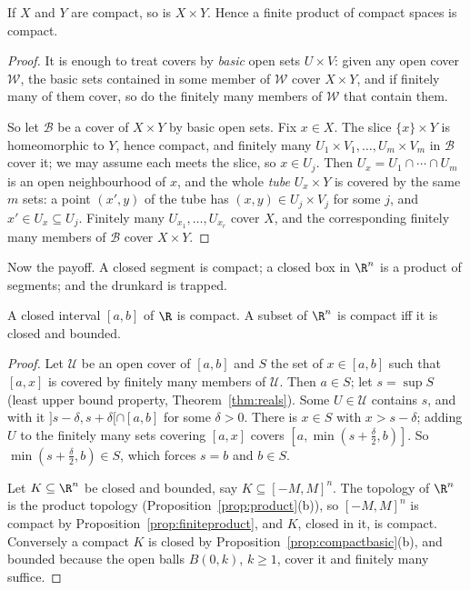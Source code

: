\begin{proposition}\label{prop:finiteproduct}
If $X$ and $Y$ are compact, so is $X\times Y$. Hence a finite product of compact spaces is compact.
\end{proposition}
\begin{proof}
It is enough to treat covers by \emph{basic} open sets $U\times V$: given any open cover $\mathcal W$, the basic sets contained in some member of $\mathcal W$
cover $X\times Y$, and if finitely many of them cover, so do the finitely many members of $\mathcal W$ that contain them.

So let $\mathcal B$ be a cover of $X\times Y$ by basic open sets. Fix $x\in X$. The slice $\{x\}\times Y$ is homeomorphic to $Y$, hence compact, and finitely many
$U_1\times V_1,\dots,U_m\times V_m$ in $\mathcal B$ cover it; we may assume each meets the slice, so $x\in U_j$. Then $U_x=U_1\cap\cdots\cap U_m$ is an open neighbourhood of
$x$, and the whole \emph{tube} $U_x\times Y$ is covered by the same $m$ sets: a point $(x',y)$ of the tube has $(x,y)\in U_j\times V_j$ for some $j$, and $x'\in U_x\subseteq U_j$.
Finitely many $U_{x_1},\dots,U_{x_r}$ cover $X$, and the corresponding finitely many members of $\mathcal B$ cover $X\times Y$.
\end{proof}

Now the payoff. A closed segment is compact; a closed box in $\R^n$ is a product of segments; and the drunkard is
trapped.

\begin{theorem}\label{thm:heineborel}
A closed interval $[a,b]$ of $\R$ is compact. A subset of $\R^n$ is compact iff it is closed and bounded.
\end{theorem}
\begin{proof}
Let $\mathcal U$ be an open cover of $[a,b]$ and $S$ the set of $x\in[a,b]$ such that $[a,x]$ is covered by finitely many members of $\mathcal U$. Then $a\in S$; let
$s=\sup S$ (least upper bound property, Theorem~\ref{thm:reals}). Some $U\in\mathcal U$ contains $s$, and with it $]s-\delta,s+\delta[\cap[a,b]$ for some $\delta>0$. There is
$x\in S$ with $x>s-\delta$; adding $U$ to the finitely many sets covering $[a,x]$ covers $[a,\min(s+\frac\delta2,b)]$. So $\min(s+\frac\delta2,b)\in S$, which forces
$s=b$ and $b\in S$.

Let $K\subseteq\R^n$ be closed and bounded, say $K\subseteq[-M,M]^n$. The topology of $\R^n$ is the product topology (Proposition~\ref{prop:product}(b)), so
$[-M,M]^n$ is compact by Proposition~\ref{prop:finiteproduct}, and $K$, closed in it, is compact. Conversely a compact $K$ is closed by
Proposition~\ref{prop:compactbasic}(b), and bounded because the open balls $B(0,k)$, $k\ge1$, cover it and finitely many suffice.
\end{proof}

